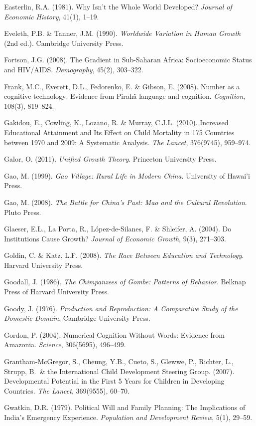 Easterlin, R.A. (1981). Why Isn't the Whole World Developed?
\emph{Journal of Economic History}, 41(1), 1--19.

Eveleth, P.B. \& Tanner, J.M. (1990). \emph{Worldwide Variation in
Human Growth} (2nd ed.). Cambridge University Press.

Fortson, J.G. (2008). The Gradient in Sub-Saharan Africa: Socioeconomic
Status and HIV/AIDS. \emph{Demography}, 45(2), 303--322.

Frank, M.C., Everett, D.L., Fedorenko, E. \& Gibson, E. (2008). Number
as a cognitive technology: Evidence from Pirahã language and cognition.
\emph{Cognition}, 108(3), 819--824.

Gakidou, E., Cowling, K., Lozano, R. \& Murray, C.J.L. (2010).
Increased Educational Attainment and Its Effect on Child Mortality in
175 Countries between 1970 and 2009: A Systematic Analysis.
\emph{The Lancet}, 376(9745), 959--974.

Galor, O. (2011). \emph{Unified Growth Theory}. Princeton University
Press.

Gao, M. (1999). \emph{Gao Village: Rural Life in Modern China}.
University of Hawai'i Press.

Gao, M. (2008). \emph{The Battle for China's Past: Mao and the Cultural
Revolution}. Pluto Press.

Glaeser, E.L., La Porta, R., López-de-Silanes, F. \& Shleifer, A.
(2004). Do Institutions Cause Growth? \emph{Journal of Economic
Growth}, 9(3), 271--303.

Goldin, C. \& Katz, L.F. (2008). \emph{The Race Between Education and
Technology}. Harvard University Press.

Goodall, J. (1986). \emph{The Chimpanzees of Gombe: Patterns of
Behavior}. Belknap Press of Harvard University Press.

Goody, J. (1976). \emph{Production and Reproduction: A Comparative
Study of the Domestic Domain}. Cambridge University Press.

Gordon, P. (2004). Numerical Cognition Without Words: Evidence from
Amazonia. \emph{Science}, 306(5695), 496--499.

Grantham-McGregor, S., Cheung, Y.B., Cueto, S., Glewwe, P., Richter,
L., Strupp, B.\ \& the International Child Development Steering Group.
(2007). Developmental Potential in the First 5 Years for Children in
Developing Countries. \emph{The Lancet}, 369(9555), 60--70.

Gwatkin, D.R. (1979). Political Will and Family Planning: The
Implications of India's Emergency Experience. \emph{Population and
Development Review}, 5(1), 29--59.

